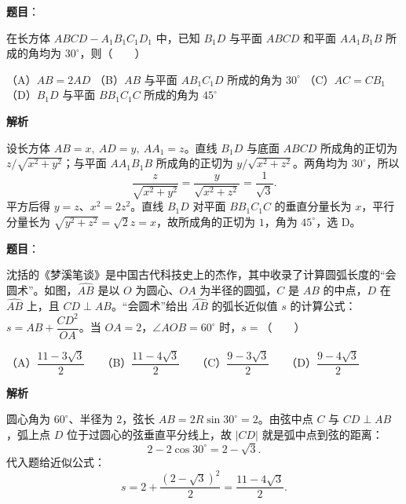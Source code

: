 \begin{answer}

\textbf{题目}：

在长方体 $ABCD-A_1B_1C_1D_1$ 中，已知 $B_1D$ 与平面 $ABCD$ 和平面 $AA_1B_1B$ 所成的角均为 $30^\circ$，则\mbox{（　　）}

（A）$AB=2AD$  
（B）$AB$ 与平面 $AB_1C_1D$ 所成的角为 $30^\circ$  
（C）$AC=CB_1$  
（D）$B_1D$ 与平面 $BB_1C_1C$ 所成的角为 $45^\circ$

\textbf{解析}

设长方体 $AB=x,\ AD=y,\ AA_1=z$。直线 $B_1D$ 与底面 $ABCD$ 所成角的正切为 $z/\sqrt{x^2+y^2}$；与平面 $AA_1B_1B$ 所成角的正切为 $y/\sqrt{x^2+z^2}$。两角均为 $30^\circ$，所以
\nopagebreak[4]
\[
\frac z{\sqrt{x^2+y^2}}=\frac y{\sqrt{x^2+z^2}}=\frac1{\sqrt3}.
\]
平方后得 $y=z$、$x^2=2z^2$。直线 $B_1D$ 对平面 $BB_1C_1C$ 的垂直分量长为 $x$，平行分量长为 $\sqrt{y^2+z^2}=\sqrt2z=x$，故所成角的正切为 $1$，角为 $45^\circ$，选 D。


\end{answer}
\begin{answer}

\textbf{题目}：

沈括的《梦溪笔谈》是中国古代科技史上的杰作，其中收录了计算圆弧长度的“会圆术”。如图，$\widehat{AB}$ 是以 $O$ 为圆心、$OA$ 为半径的圆弧，$C$ 是 $AB$ 的中点，$D$ 在 $\widehat{AB}$ 上，且 $CD\perp AB$。“会圆术”给出 $\widehat{AB}$ 的弧长近似值 $s$ 的计算公式：$s=AB+\dfrac{CD^2}{OA}$。当 $OA=2$，$\angle AOB=60^\circ$ 时，$s=$\mbox{（　　）}

（A）$\dfrac{11-3\sqrt3}{2}$　　（B）$\dfrac{11-4\sqrt3}{2}$　　（C）$\dfrac{9-3\sqrt3}{2}$　　（D）$\dfrac{9-4\sqrt3}{2}$
\nopagebreak[4]
\begin{center}\end{center}
\nopagebreak[4]
\textbf{解析}

圆心角为 $60^\circ$、半径为 $2$，弦长 $AB=2R\sin30^\circ=2$。由弦中点 $C$ 与 $CD\perp AB$，弧上点 $D$ 位于过圆心的弦垂直平分线上，故 $|CD|$ 就是弧中点到弦的距离：
\nopagebreak[4]
\[
2-2\cos30^\circ=2-\sqrt3.
\]
代入题给近似公式：
\nopagebreak[4]
\[
s=2+\frac{(2-\sqrt3)^2}{2}=\frac{11-4\sqrt3}{2}.
\]


\end{answer}
